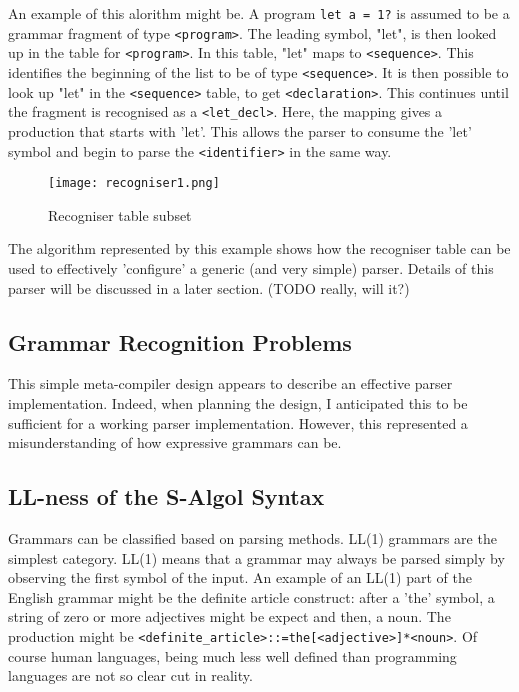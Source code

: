 \documentclass{article}
\begin{document}
An example of this alorithm might be. A program \lstinline{let a = 1?} is assumed to be a grammar fragment of type \lstinline{<program>}. The leading symbol, "let", is then looked up in the table for \lstinline{<program>}. In this table, "let" maps to \lstinline{<sequence>}. This identifies the beginning of the list to be of type \lstinline{<sequence>}. It is then possible to look up "let" in the \lstinline{<sequence>} table, to get \lstinline{<declaration>}. This continues until the fragment is recognised as a \lstinline{<let_decl>}. Here, the mapping gives a production that starts with 'let'. This allows the parser to consume the 'let' symbol and begin to parse the \lstinline{<identifier>} in the same way.

\begin{figure}[htbp]
  \texttt{[image: recogniser1.png]}
  \centering
  \caption{Recogniser table subset}
  \label{fig:recogniserobj}
\end{figure}

The algorithm represented by this example shows how the recogniser table can be used to effectively 'configure' a generic (and very simple) parser. Details of this parser will be discussed in a later section. (TODO really, will it?)

\subsection{Grammar Recognition Problems}

This simple meta-compiler design appears to describe an effective parser implementation. Indeed, when planning the design, I anticipated this to be sufficient for a working parser implementation. However, this represented a misunderstanding of how expressive grammars can be.

\subsection{LL-ness of the S-Algol Syntax}

Grammars can be classified based on parsing methods. LL(1) grammars are the simplest category. LL(1) means that a grammar may always be parsed simply by observing the first symbol of the input. An example of an LL(1) part of the English grammar might be the definite article construct: after a 'the' symbol, a string of zero or more adjectives might be expect and then, a noun. The production might be \lstinline{<definite_article>::=the[<adjective>]*<noun>}. Of course human languages, being much less well defined than programming languages are not so clear cut in reality.
\end{document}
